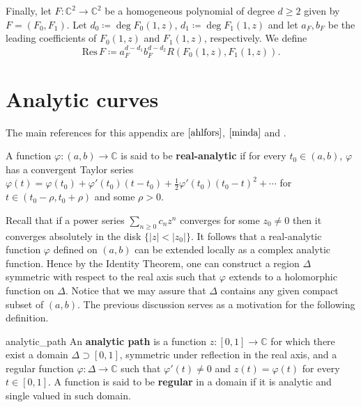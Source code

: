 Finally, let $F:\mathbb{C}^2 \rightarrow \mathbb{C}^2$ be a homogeneous polynomial of degree $d\geq 2$ given by $F=(F_0,F_1)$. Let $d_0 \coloneqq \deg F_0(1,z)$, $d_1 \coloneqq \deg F_1(1,z)$  and let $a_F,b_F$ be the leading coefficients of $F_0(1,z)$ and $F_1(1,z)$, respectively. We define
\begin{equation}\label{defresultant2}
\text{Res}\,F \coloneqq a_F^{d-d_1}b_F^{d-d_2}R(F_0(1,z),F_1(1,z)).
\end{equation}

\section{Analytic curves}\label{analyticcurves}

The main references for this appendix are $\cite{ahlfors}$, $\cite{minda}$ and \cite{jenkins}.
\begin{mydef}{}{}
A function $\varphi:(a,b)\rightarrow \mathbb{C}$ is said to be {\bf real-analytic} if for every $t_0\in(a,b)$, $\varphi$ has a convergent Taylor series $\varphi(t) = \varphi(t_0)+\varphi'(t_0)(t-t_0) + \frac{1}{2}\varphi'(t_0)(t_0-t)^2+\cdots$ for $t\in (t_0-\rho,t_0+\rho)$ and some $\rho>0$.
\end{mydef}

Recall that if a power series $\sum_{n\geq 0}c_nz^n$ converges for some $z_0\neq 0$ then it converges absolutely in the disk $\{|z|<|z_0|\}$. It follows that a real-analytic function $\varphi$  defined on $(a,b)$ can be extended locally as a complex analytic function. Hence by the Identity Theorem, one can construct a region $\Delta$ symmetric with respect to the real axis such that $\varphi$ extends to a holomorphic function on $\Delta$. Notice that we may assure that $\Delta$ contains any given compact subset of $(a,b)$. The previous discussion serves as a motivation for the following definition.

\begin{mydef}{}{analytic_path}
An {\bf analytic path} is a function $z:[0,1]\rightarrow \mathbb{C}$ for which there exist a domain $\Delta\supset [0,1]$, symmetric under reflection in the real axis, and a regular function $\varphi:\Delta \rightarrow \mathbb{C}$ such that $\varphi'(t)\neq 0$ and $z(t)=\varphi(t)$ for every $t\in [0,1]$. A function is said to be {\bf regular} in a domain if it is analytic and single valued in such domain.
\end{mydef}

